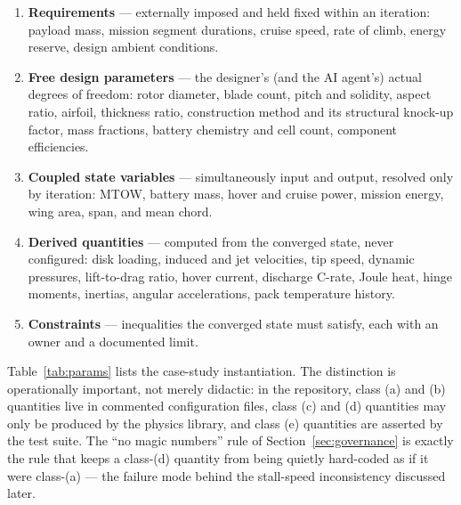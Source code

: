 \begin{enumerate}[nosep,label=(\alph*)]
\item \textbf{Requirements} --- externally imposed and held fixed
  within an iteration: payload mass, mission segment durations, cruise
  speed, rate of climb, energy reserve, design ambient conditions.
\item \textbf{Free design parameters} --- the designer's (and the
  AI agent's) actual degrees of freedom: rotor diameter, blade count,
  pitch and solidity, aspect ratio, airfoil, thickness ratio,
  construction method and its structural knock-up factor, mass
  fractions, battery chemistry and cell count, component efficiencies.
\item \textbf{Coupled state variables} --- simultaneously input and
  output, resolved only by iteration: MTOW, battery mass, hover and
  cruise power, mission energy, wing area, span, and mean chord.
\item \textbf{Derived quantities} --- computed from the converged
  state, never configured: disk loading, induced and jet velocities,
  tip speed, dynamic pressures, lift-to-drag ratio, hover current,
  discharge C-rate, Joule heat, hinge moments, inertias, angular
  accelerations, pack temperature history.
\item \textbf{Constraints} --- inequalities the converged state must
  satisfy, each with an owner and a documented limit.
\end{enumerate}

Table~\ref{tab:params} lists the case-study instantiation. The
distinction is operationally important, not merely didactic: in the
repository, class (a) and (b) quantities live in commented
configuration files, class (c) and (d) quantities may only be produced
by the physics library, and class (e) quantities are asserted by the
test suite. The ``no magic numbers'' rule of
Section~\ref{sec:governance} is exactly the rule that keeps a class-(d)
quantity from being quietly hard-coded as if it were class-(a) --- the
failure mode behind the stall-speed inconsistency discussed later.


